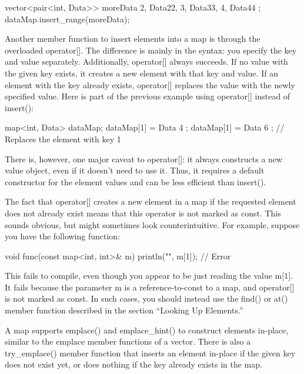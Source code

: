 \begin{cpp}
vector<pair<int, Data>> moreData { {2, Data{22}}, {3, Data{33}}, {4, Data{44}} };
dataMap.insert_range(moreData);
\end{cpp}


Another member function to insert elements into a map is through the overloaded operator[]. The difference is mainly in the syntax: you specify the key and value separately. Additionally, operator[] always succeeds. If no value with the given key exists, it creates a new element with that key and value. If an element with the key already exists, operator[] replaces the value with the newly specified value. Here is part of the previous example using operator[] instead of insert():

\begin{cpp}
map<int, Data> dataMap;
dataMap[1] = Data { 4 };
dataMap[1] = Data { 6 }; // Replaces the element with key 1
\end{cpp}

There is, however, one major caveat to operator[]: it always constructs a new value object, even if it doesn’t need to use it. Thus, it requires a default constructor for the element values and can be less efficient than insert().

The fact that operator[] creates a new element in a map if the requested element does not already exist means that this operator is not marked as const. This sounds obvious, but might sometimes look counterintuitive. For example, suppose you have the following function:

\begin{cpp}
void func(const map<int, int>& m)
{
    println("{}", m[1]); // Error
}
\end{cpp}

This fails to compile, even though you appear to be just reading the value m[1]. It fails because the parameter m is a reference-to-const to a map, and operator[] is not marked as const. In such cases, you should instead use the find() or at() member function described in the section “Looking Up Elements.”


A map supports emplace() and emplace\_hint() to construct elements in-place, similar to the emplace member functions of a vector. There is also a try\_emplace() member function that inserts an element in-place if the given key does not exist yet, or does nothing if the key already exists in the map.

